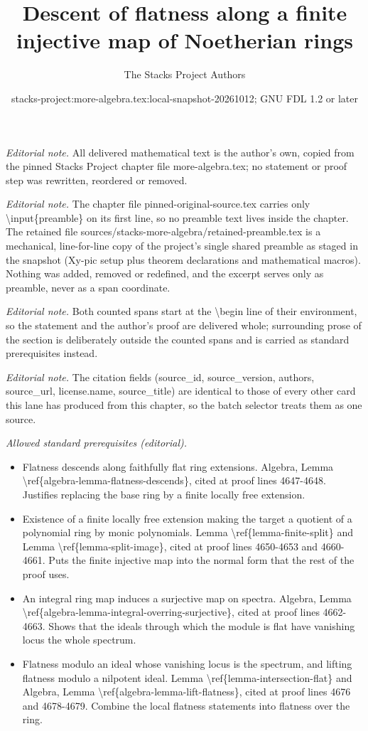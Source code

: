 \documentclass[10pt,a4paper]{amsart}
\title{Descent of flatness along a finite injective map of Noetherian rings}
\author{The Stacks Project Authors}
\date{stacks-project:more-algebra.tex:local-snapshot-20261012; GNU FDL 1.2 or later}
\theoremstyle{plain}
\theoremstyle{definition}
\theoremstyle{remark}
\numberwithin{equation}{subsection}
\begin{document}
\maketitle
\setcounter{subsection}{1}
\noindent\textit{Editorial note.} All delivered mathematical text is the author's own, copied from the pinned Stacks Project chapter file more-algebra.tex; no statement or proof step was rewritten, reordered or removed.\par\medskip
\noindent\textit{Editorial note.} The chapter file pinned-original-source.tex carries only \textbackslash{}input\{preamble\} on its first line, so no preamble text lives inside the chapter. The retained file sources/stacks-more-algebra/retained-preamble.tex is a mechanical, line-for-line copy of the project's single shared preamble as staged in the snapshot (Xy-pic setup plus theorem declarations and mathematical macros). Nothing was added, removed or redefined, and the excerpt serves only as preamble, never as a span coordinate.\par\medskip
\noindent\textit{Editorial note.} Both counted spans start at the \textbackslash{}begin line of their environment, so the statement and the author's proof are delivered whole; surrounding prose of the section is deliberately outside the counted spans and is carried as standard prerequisites instead.\par\medskip
\noindent\textit{Editorial note.} The citation fields (source\_id, source\_version, authors, source\_url, license.name, source\_title) are identical to those of every other card this lane has produced from this chapter, so the batch selector treats them as one source.\par\medskip
\noindent\textit{Allowed standard prerequisites (editorial).}\begin{itemize}
\item Flatness descends along faithfully flat ring extensions. Algebra, Lemma \textbackslash{}ref\{algebra-lemma-flatness-descends\}, cited at proof lines 4647-4648. Justifies replacing the base ring by a finite locally free extension.
\item Existence of a finite locally free extension making the target a quotient of a polynomial ring by monic polynomials. Lemma \textbackslash{}ref\{lemma-finite-split\} and Lemma \textbackslash{}ref\{lemma-split-image\}, cited at proof lines 4650-4653 and 4660-4661. Puts the finite injective map into the normal form that the rest of the proof uses.
\item An integral ring map induces a surjective map on spectra. Algebra, Lemma \textbackslash{}ref\{algebra-lemma-integral-overring-surjective\}, cited at proof lines 4662-4663. Shows that the ideals through which the module is flat have vanishing locus the whole spectrum.
\item Flatness modulo an ideal whose vanishing locus is the spectrum, and lifting flatness modulo a nilpotent ideal. Lemma \textbackslash{}ref\{lemma-intersection-flat\} and Algebra, Lemma \textbackslash{}ref\{algebra-lemma-lift-flatness\}, cited at proof lines 4676 and 4678-4679. Combine the local flatness statements into flatness over the ring.
\end{itemize}\medskip
\end{document}
